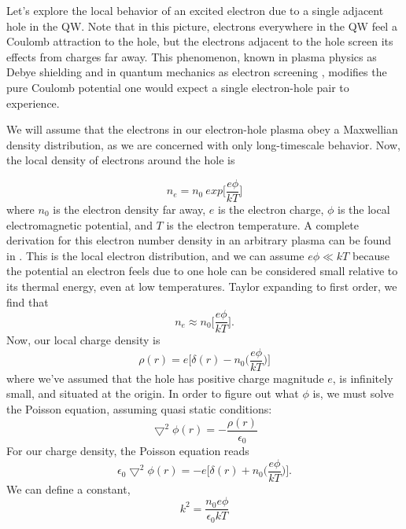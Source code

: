 \indent Let's explore the local behavior of an excited electron due to a single adjacent hole in the QW. Note that in this picture, electrons everywhere in the QW feel a Coulomb attraction to the hole, but the electrons adjacent to the hole screen its effects from charges far away. This phenomenon, known in plasma physics as Debye shielding \cite{chen} and in quantum mechanics as electron screening \cite{griffiths}, modifies the pure Coulomb potential one would expect a single electron-hole pair to experience. 

\indent We will assume that the electrons in our electron-hole plasma obey a Maxwellian density distribution, as we are concerned with only long-timescale behavior. Now, the local density of electrons around the hole is 

\begin{equation}
n_e = n_{0}~ exp \Big[ \frac{e\phi}{k T}\Big]
\end{equation}
where $n_{0}$ is the electron density far away, $e$ is the electron charge, $\phi$ is the local electromagnetic potential, and  $T$ is the electron temperature. A complete derivation for this electron number density in an arbitrary plasma can be found in \cite{chen}. This is the local electron distribution, and we can assume $e\phi \ll kT$ because the potential an electron feels due to one hole can be considered small relative to its thermal energy, even at low temperatures. Taylor expanding to first order, we find that
\begin{equation}
n_e \approx n_0 \Big[ \frac{e\phi}{k T}\Big ].
\end{equation}
Now, our local charge density is 
\begin{equation}
\rho(r) = e \Big [ \delta(r) - n_0 \Big( \frac{e\phi}{k T}\Big ) \Big]
\end{equation}
where we've assumed that the hole has positive charge magnitude $e$, is infinitely small, and situated at the origin. In order to figure out what $\phi$ is, we must solve the Poisson equation, assuming quasi static conditions:
\begin{equation}
\bigtriangledown^2 \phi(r)= -\frac{\rho(r)}{\epsilon_{0}}
\end{equation}
 For our charge density, the Poisson equation reads
\begin{equation} \label{pois}
\epsilon_0 \bigtriangledown^2 \phi(r) = -e \Big [ \delta(r) + n_0 \Big( \frac{e\phi}{k T}\Big ) \Big].
\end{equation}
We can define a constant, 
\begin{equation}
k^2 = \frac{n_0 e\phi}{\epsilon_0 k T}
\end{equation}
